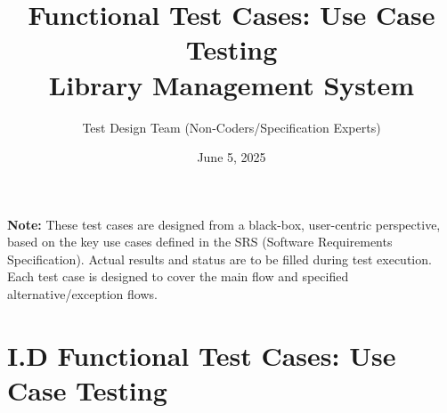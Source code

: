 \documentclass[10pt, a4paper]{report}
\title{Functional Test Cases: Use Case Testing \\ \large Library Management System}
\author{Test Design Team (Non-Coders/Specification Experts)}
\date{June 5, 2025}
\begin{document}
\maketitle
\begin{center}
    \textbf{Note:} These test cases are designed from a black-box, user-centric perspective, based on the key use cases defined in the SRS (Software Requirements Specification). Actual results and status are to be filled during test execution. Each test case is designed to cover the main flow and specified alternative/exception flows.
\end{center}

\section*{I.D Functional Test Cases: Use Case Testing}
\end{document}
